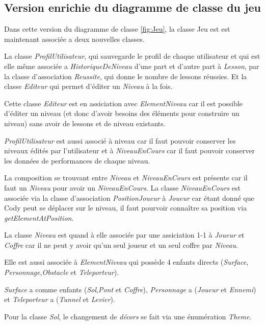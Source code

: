 
\subsection{Version enrichie du diagramme de classe du jeu}
\label{sec:question-2}

Dans cette version du diagramme de classe \ref{fig:Jeu}, la classe Jeu est est maintenant associée a deux nouvelles classes.

La classe \emph{ProfilUtilisateur}, qui sauvegarde le profil de chaque utilisateur et qui est elle même associée a \emph{HistoriqueDeNiveau} d'une part
et d'autre part à \emph{Lesson}, par la classe d'association \emph{Reussite}, qui donne le nombre de lessons réussies.
Et la classe \emph{Editeur} qui permet d'éditer un \emph{Niveau} à la fois. 

Cette classe \emph{Editeur} est en assiciation avec \emph{ElementNiveau}
car il est possible d'éditer un niveau (et donc d'avoir besoins des éléments pour construire un niveau) sans avoir de lessons et de niveau existants.

\emph{ProfilUtilisateur} est aussi associé à niveau car il faut pouvoir conserver les niveaux édités par l'utilisateur et à \emph{NiveauEnCours} car il
faut pouvoir conserver les données de performances de chaque niveau. 

La composition se trouvant entre \emph{Niveau} et \emph{NiveauEnCours} est présente
car il faut un \emph{Niveau} pour avoir un \emph{NiveauEnCours}. La classe \emph{NiveauEnCours} est associée via la classe d'association \emph{PositionJoueur}
à \emph{Joueur} car étant donné que Cody peut se déplacer sur le niveau, il faut pourvoir connaître sa position via \emph{getElementAtPosition}.

La classe \emph{Niveau} est quand à elle associée par une assiciation 1-1 à \emph{Joueur} et \emph{Coffre} car il ne peut y avoir qu'un seul joueur et un
seul coffre par \emph{Niveau}. 

Elle est aussi associée à \emph{ElementNiveau} qui possède 4 enfants directs (\emph{Surface},
\emph{Personnage},\emph{Obstacle} et \emph{Teleporteur}).

\emph{Surface} a comme enfants (\emph{Sol},\emph{Pont} et \emph{Coffre}), \emph{Personnage} a (\emph{Joueur} et \emph{Ennemi}) et \emph{Teleporteur} a
(\emph{Tunnel} et \emph{Levier}). 

Pour la classe \emph{Sol}, le changement de \emph{décors} se fait via une énumération \emph{Theme}. 


